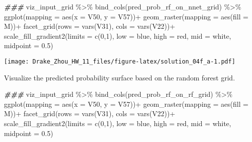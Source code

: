 \documentclass[
]{article}
\newenvironment{Shaded}{\begin{snugshade}}{\end{snugshade}}
\newcommand{\AttributeTok}[1]{\textcolor[rgb]{0.77,0.63,0.00}{#1}}
\newcommand{\DecValTok}[1]{\textcolor[rgb]{0.00,0.00,0.81}{#1}}
\newcommand{\DocumentationTok}[1]{\textcolor[rgb]{0.56,0.35,0.01}{\textbf{\textit{#1}}}}
\newcommand{\FloatTok}[1]{\textcolor[rgb]{0.00,0.00,0.81}{#1}}
\newcommand{\FunctionTok}[1]{\textcolor[rgb]{0.00,0.00,0.00}{#1}}
\newcommand{\NormalTok}[1]{#1}
\newcommand{\SpecialCharTok}[1]{\textcolor[rgb]{0.00,0.00,0.00}{#1}}
\newcommand{\StringTok}[1]{\textcolor[rgb]{0.31,0.60,0.02}{#1}}
\begin{document}
\begin{Shaded}
\begin{Highlighting}[]
\DocumentationTok{\#\#\#}
\NormalTok{viz\_input\_grid }\SpecialCharTok{\%\textgreater{}\%}
  \FunctionTok{bind\_cols}\NormalTok{(pred\_prob\_rf\_on\_nnet\_grid) }\SpecialCharTok{\%\textgreater{}\%}
  \FunctionTok{ggplot}\NormalTok{(}\AttributeTok{mapping =} \FunctionTok{aes}\NormalTok{(}\AttributeTok{x =}\NormalTok{ V50, }\AttributeTok{y =}\NormalTok{ V57))}\SpecialCharTok{+}
  \FunctionTok{geom\_raster}\NormalTok{(}\AttributeTok{mapping =} \FunctionTok{aes}\NormalTok{(}\AttributeTok{fill =}\NormalTok{ M))}\SpecialCharTok{+}
  \FunctionTok{facet\_grid}\NormalTok{(}\AttributeTok{rows =} \FunctionTok{vars}\NormalTok{(V31), }\AttributeTok{cols =} \FunctionTok{vars}\NormalTok{(V22))}\SpecialCharTok{+}
  \FunctionTok{scale\_fill\_gradient2}\NormalTok{(}\AttributeTok{limits =} \FunctionTok{c}\NormalTok{(}\DecValTok{0}\NormalTok{,}\DecValTok{1}\NormalTok{), }
                       \AttributeTok{low =} \StringTok{\textquotesingle{}blue\textquotesingle{}}\NormalTok{, }
                       \AttributeTok{high =} \StringTok{\textquotesingle{}red\textquotesingle{}}\NormalTok{, }
                       \AttributeTok{mid =} \StringTok{\textquotesingle{}white\textquotesingle{}}\NormalTok{, }
                       \AttributeTok{midpoint =} \FloatTok{0.5}\NormalTok{) }
\end{Highlighting}
\end{Shaded}

\texttt{[image: Drake\_Zhou\_HW\_11\_files/figure-latex/solution\_04f\_a-1.pdf]}

Visualize the predicted probability surface based on the random forest
grid.

\begin{Shaded}
\begin{Highlighting}[]
\DocumentationTok{\#\#\#}
\NormalTok{viz\_input\_grid }\SpecialCharTok{\%\textgreater{}\%}
  \FunctionTok{bind\_cols}\NormalTok{(pred\_prob\_rf\_on\_rf\_grid) }\SpecialCharTok{\%\textgreater{}\%}
  \FunctionTok{ggplot}\NormalTok{(}\AttributeTok{mapping =} \FunctionTok{aes}\NormalTok{(}\AttributeTok{x =}\NormalTok{ V50, }\AttributeTok{y =}\NormalTok{ V57))}\SpecialCharTok{+}
  \FunctionTok{geom\_raster}\NormalTok{(}\AttributeTok{mapping =} \FunctionTok{aes}\NormalTok{(}\AttributeTok{fill =}\NormalTok{ M))}\SpecialCharTok{+}
  \FunctionTok{facet\_grid}\NormalTok{(}\AttributeTok{rows =} \FunctionTok{vars}\NormalTok{(V31), }\AttributeTok{cols =} \FunctionTok{vars}\NormalTok{(V22))}\SpecialCharTok{+}
  \FunctionTok{scale\_fill\_gradient2}\NormalTok{(}\AttributeTok{limits =} \FunctionTok{c}\NormalTok{(}\DecValTok{0}\NormalTok{,}\DecValTok{1}\NormalTok{), }
                       \AttributeTok{low =} \StringTok{\textquotesingle{}blue\textquotesingle{}}\NormalTok{, }
                       \AttributeTok{high =} \StringTok{\textquotesingle{}red\textquotesingle{}}\NormalTok{, }
                       \AttributeTok{mid =} \StringTok{\textquotesingle{}white\textquotesingle{}}\NormalTok{, }
                       \AttributeTok{midpoint =} \FloatTok{0.5}\NormalTok{)}
\end{Highlighting}
\end{Shaded}
\end{document}
